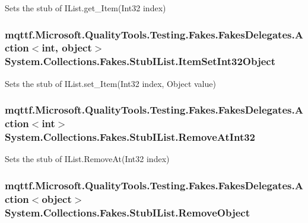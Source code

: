 Sets the stub of I\-List.\-get\-\_\-\-Item(\-Int32 index)

\hypertarget{class_system_1_1_collections_1_1_fakes_1_1_stub_i_list_a0e2ef2178c3988aed30aacd00df879da}{
\subsubsection[{Item\-Set\-Int32\-Object}]{\setlength{\rightskip}{0pt plus 5cm}mqttf.\-Microsoft.\-Quality\-Tools.\-Testing.\-Fakes.\-Fakes\-Delegates.\-Action$<$int, object$>$ System.\-Collections.\-Fakes.\-Stub\-I\-List.\-Item\-Set\-Int32\-Object}}\label{class_system_1_1_collections_1_1_fakes_1_1_stub_i_list_a0e2ef2178c3988aed30aacd00df879da}


Sets the stub of I\-List.\-set\-\_\-\-Item(\-Int32 index, Object value)

\hypertarget{class_system_1_1_collections_1_1_fakes_1_1_stub_i_list_ab84925b439d13a226a27b2cc191a3a2d}{
\subsubsection[{Remove\-At\-Int32}]{\setlength{\rightskip}{0pt plus 5cm}mqttf.\-Microsoft.\-Quality\-Tools.\-Testing.\-Fakes.\-Fakes\-Delegates.\-Action$<$int$>$ System.\-Collections.\-Fakes.\-Stub\-I\-List.\-Remove\-At\-Int32}}\label{class_system_1_1_collections_1_1_fakes_1_1_stub_i_list_ab84925b439d13a226a27b2cc191a3a2d}


Sets the stub of I\-List.\-Remove\-At(\-Int32 index)

\hypertarget{class_system_1_1_collections_1_1_fakes_1_1_stub_i_list_ad0df482c75781b2264ceffaa5fa31eda}{
\subsubsection[{Remove\-Object}]{\setlength{\rightskip}{0pt plus 5cm}mqttf.\-Microsoft.\-Quality\-Tools.\-Testing.\-Fakes.\-Fakes\-Delegates.\-Action$<$object$>$ System.\-Collections.\-Fakes.\-Stub\-I\-List.\-Remove\-Object}}\label{class_system_1_1_collections_1_1_fakes_1_1_stub_i_list_ad0df482c75781b2264ceffaa5fa31eda}


